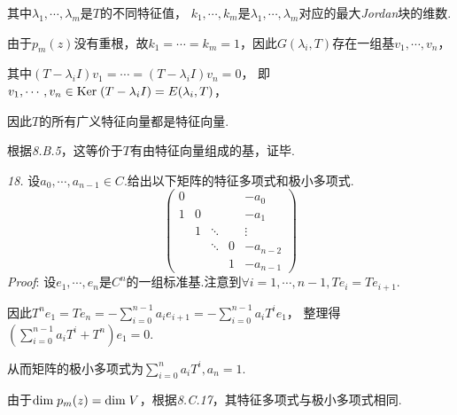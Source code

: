 其中\(\lambda_1,\cdots,\lambda_m\)是\(T\)的不同特征值，
\(k_1,\cdots,k_m\)是\(\lambda_1,\cdots,\lambda_m\)对应的最大\textit{Jordan}块的维数.

由于\(p_m(z)\)没有重根，故\(k_1=\cdots=k_m=1\)，因此\(G(\lambda_i,T)\)存在一组基\(v_1,\cdots,v_n\)，

其中\((T-\lambda_i I)v_1=\cdots=(T-\lambda_i I)v_n=0\)，
即\(v_1,\cdots,v_n \in \mathrm{Ker \;} (T-\lambda_i I)=E(\lambda_i,T)\)，

因此\(T\)的所有广义特征向量都是特征向量.

根据\textit{8.B.5}，这等价于\(T\)有由特征向量组成的基，证毕.

\hspace*{\fill}

\textit{18.}
设\(a_0,\cdots,a_{n-1} \in C\).给出以下矩阵的特征多项式和极小多项式.
    \begin{equation*}
        \begin{pmatrix}
            0 &   &        &   & -a_0     \\
            1 & 0 &        &   & -a_1     \\
            & 1 & \ddots &   & \vdots   \\
            &   & \ddots & 0 & -a_{n-2} \\
            &   &        & 1 & -a_{n-1} 
        \end{pmatrix}
    \end{equation*}
\textit{Proof}:
设\(e_1,\cdots,e_n\)是\(C^n\)的一组标准基.注意到\(\forall i=1,\cdots,n-1,Te_i=Te_{i+1}\).

因此\(T^n e_1=Te_n=-\sum_{i=0}^{n-1}a_ie_{i+1}=-\sum_{i=0}^{n-1}a_iT^ie_1\)，
整理得\((\sum_{i=0}^{n-1}a_iT^i+T^n)e_1=0\).

从而矩阵的极小多项式为\(\sum_{i=0}^n a_iT^i,a_n=1\).

由于\(\mathrm{dim \;} p_m(z)=\mathrm{dim \;} V\)，根据\textit{8.C.17}，其特征多项式与极小多项式相同.

